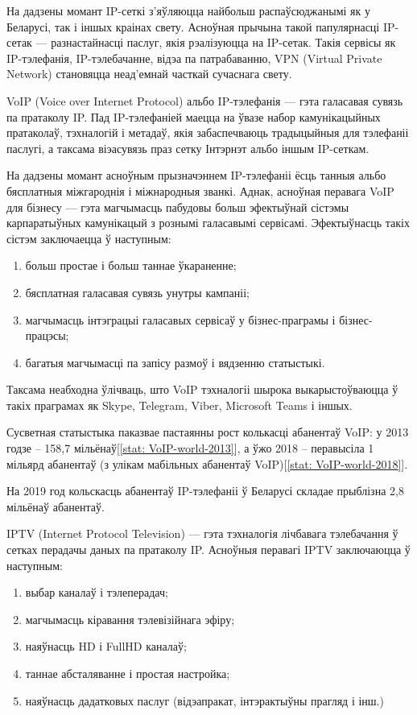 \sectionWithoutNumber{\prefacename}

На дадзены момант IP-сеткі з'яўляюцца найбольш распаўсюджанымі як
у Беларусі, так і іншых краінах свету. Асноўная прычына такой
папулярнасці IP-сетак --- разнастайнасці паслуг, якія рэалізуюцца
на IP-сетак. Такія сервісы як IP-тэлефанія, IP-тэлебачанне, відэа
па патрабаванню, VPN (Virtual Private Network) становяцца
неад'емнай часткай сучаснага свету.

VoIP (Voice over Internet Protocol) альбо IP-тэлефанія --- гэта
галасавая сувязь па пратаколу IP. Пад IP-тэлефаніей маецца на ўвазе
набор камунікацыйных пратаколаў, тэхналогій і метадаў, якія
забаспечваюць традыцыйныя для тэлефаніі паслугі, а таксама віэасувязь
праз сетку Інтэрнэт альбо іншым IP-сеткам.

На дадзены момант асноўным прызначэннем IP-тэлефаніі ёсць танныя альбо
бяс\-плат\-ныя міжгароднія і міжнародныя званкі. Аднак, асноўная перавага
VoIP для бізнесу --- гэта магчымасць пабудовы больш эфектыўнай сістэмы
карпаратыўных камунікацый з рознымі галасавымі сервісамі.
Эфектыўнасць такіх сістэм заключаецца ў наступным:
\begin{enumerate}
    \item больш простае і больш таннае ўкараненне;
    \item бясплатная галасавая сувязь унутры кампаніі;
    \item магчымасць інтэграцыі галасавых сервісаў у
          бізнес-праграмы і бізнес-працэсы;
    \item багатыя магчымасці па запісу размоў і вядзенню статыстыкі.
\end{enumerate}

Таксама неабходна ўлічваць, што VoIP тэхналогіі шырока
выкарыстоўваюцца ў такіх праграмах як Skype, Telegram, Viber,
Microsoft Teams і іншых.

Сусветная статыстыка паказвае пастаянны рост колькасці
абанентаў VoIP: у 2013 годзе -- 158,7 мільёнаў[\ref{stat: VoIP-world-2013}],
а ўжо 2018 -- перавысіла 1 мільярд абанентаў (з улікам мабільных абанентаў VoIP)[\ref{stat: VoIP-world-2018}].

На 2019 год кольскасць абанентаў IP-тэлефаніі ў Беларусі складае
прыблізна 2,8 мі\-льёнаў абанентаў.

IPTV (Internet Protocol Television) --- гэта тэхналогія лічбавага
тэлебачання ў сетках перадачы даных па пратаколу IP.
Асноўныя перавагі IPTV заключаюцца ў наступным:
\begin{enumerate}
    \item выбар каналаў і тэлеперадач;
    \item магчымасць кіравання тэлевізійнага эфіру;
    \item наяўнасць HD і FullHD каналаў;
    \item таннае абсталяванне і простая настройка;
    \item наяўнасць дадатковых паслуг (відэапракат, інтэрактыўны прагляд
          і інш.)
\end{enumerate}

